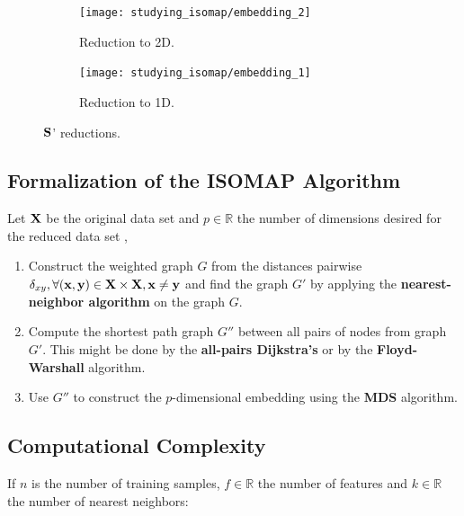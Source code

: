 \begin{figure}[H]
    \begin{subfigure}{.5\linewidth}
		\centering
		\captionsetup{justification=centering}
		\texttt{[image: studying\_isomap/embedding\_2]}
		\caption{Reduction to 2D.}
		\label{fig:mani_s_reduced_1}
	\end{subfigure}%
	\begin{subfigure}{.5\linewidth}
		\centering
		\captionsetup{justification=centering}
		\texttt{[image: studying\_isomap/embedding\_1]}
		\caption{Reduction to 1D.}
		\label{fig:mani_s_reduced_2}
	\end{subfigure}
	\caption{$\mathbf{S}$' reductions.}
	\label{fig:mani_s_reduced}
\end{figure}

\newpage
\subsection{Formalization of the ISOMAP Algorithm}

Let $\mathbf{X}$ be the original data set and $p \in \mathbb{R}$ the number of dimensions desired for the reduced data set \cite{ten2000},

\begin{enumerate}
	\item Construct the weighted graph $G$ from the distances pairwise $\delta_{xy}, \forall (\mathbf{x}, \mathbf{y}) \in \mathbf{X} \times \mathbf{X}, \mathbf{x} \ne \mathbf{y}$ and find the graph $G'$ by applying the \textbf{nearest-neighbor algorithm} on the graph $G$.

	\item Compute the shortest path graph $G''$ between all pairs of nodes from graph $G'$. This might be done by the \textbf{all-pairs Dijkstra's} or by the \textbf{Floyd-Warshall} algorithm.

	\item Use $G''$ to construct the $p$-dimensional embedding using the \textbf{MDS} algorithm.
\end{enumerate}

\subsection{Computational Complexity}
\label{sec:isocomplexity}

If $n$ is the number of training samples, $f \in \mathbb{R}$ the number of features and $k \in \mathbb{R}$ the number of nearest neighbors:

